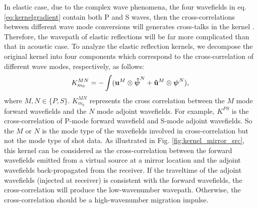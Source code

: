 \documentclass[extra,mreferee]{gji}
\newcommand{\bsy}[1]{\boldsymbol{{}#1}}
\begin{document}
In elastic case, due to the complex wave phenomena, the four wavefields in eq.
\eqref{eq:kernelgradient} contain both P and S waves, then the cross-correlations between
different wave mode conversions will generates cross-talks in the kernel \cite[]{Wang2017ERTI}. Therefore, the wavepath of elastic reflections will 
be far more complicated than that in acoustic case.
To analyze the elastic reflection kernels, 
we decompose the original kernel into four components which 
correspond to the cross-correlation of different wave modes, respectively, as follows:
\begin{equation}
    K_{m_0}^{MN}     
    =-\int(\mathbf{u}^M\otimes\bsy{\hat\psi}^N
	+\mathbf{\hat{u}}^M\otimes\bsy{\psi}^N),\\
    \label{eq:decompkernel} 
\end{equation}
where $M,N\in\{P,S\}$.
$K_{m_0}^{MN}$ represents the cross correlation between the $M$ mode forward wavefields and the 
$N$ mode adjoint wavefields. 
For example, $K^{PS}$ is the
cross-correlation of P-mode forward wavefield and S-mode adjoint wavefields. So the $M$ or $N$ is
the mode type of the wavefields involved in cross-correlation but not 
the mode type of shot data.
As illustrated in Fig. \ref{fig:kernel_mirror_src}, this
kernel can be considered as the cross-correlation between the forward wavefields
emitted from a virtual source at a mirror location and the adjoint wavefields
back-propagated from the receiver. If the traveltime of the adjoint wavefields (injected at
receiver) is consistent with the forward wavefields, the cross-correlation will
produce the low-wavenumber wavepath. Otherwise, the cross-correlation
should be a high-wavenumber migration impulse. 
\end{document}
